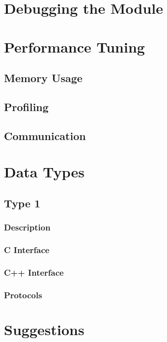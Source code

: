 \chapter{Debugging the Module}




\chapter{Performance Tuning}


\section{Memory Usage}


\section{Profiling}


\section{Communication}



\appendix
\chapter{Data Types}


\section{Type 1}

\subsection{Description}

\subsection{C Interface}

\subsection{C++ Interface}

\subsection{Protocols}




\chapter{Suggestions}












